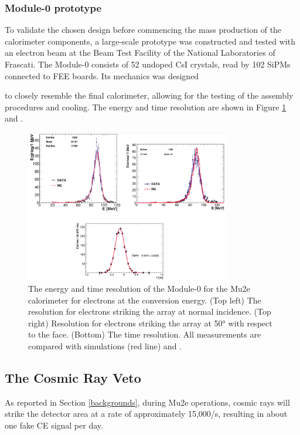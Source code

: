 \subsubsection{Module-0 prototype}
To validate the chosen design before commencing the mass production of 
the calorimeter components, a large-scale prototype was constructed and 
tested with an electron beam at the Beam Test Facility of the National 
Laboratories of Frascati. The Module-0 consists of 52 undoped CsI crystals, 
read by 102 SiPMs connected to FEE boards. Its mechanics was designed

to closely resemble the final calorimeter, allowing for the testing 
of the assembly procedures and cooling.
The energy and time resolution are
shown in Figure \ref{fig:calores} \cite{bobbb} and \cite{calo95}.
\begin{figure}[!h]
    \centering
    \includegraphics[width =0.8\textwidth]{figures/png/Screenshot_20240330_105520.png}
    \caption[The energy and time resolution of the calorimeter Module-0.]{The 
    energy and time resolution of the Module-0 for the Mu2e 
    calorimeter for electrons at the conversion energy. (Top left) The resolution 
    for electrons striking the array at normal incidence. (Top right) 
    Resolution for electrons striking the array at 50° with respect to the 
    face. (Bottom) The time resolution. All measurements are compared with 
    simulations (red line) \cite{bobbb} and \cite{calo95}.}
    \label{fig:calores}
\end{figure}
\subsection{The Cosmic Ray Veto}\label{CRV}
As reported in Section \ref{backgrounds}, during Mu2e operations, cosmic 
rays will strike the detector area at a rate of approximately 15,000/s, resulting in about one fake CE signal per day.

